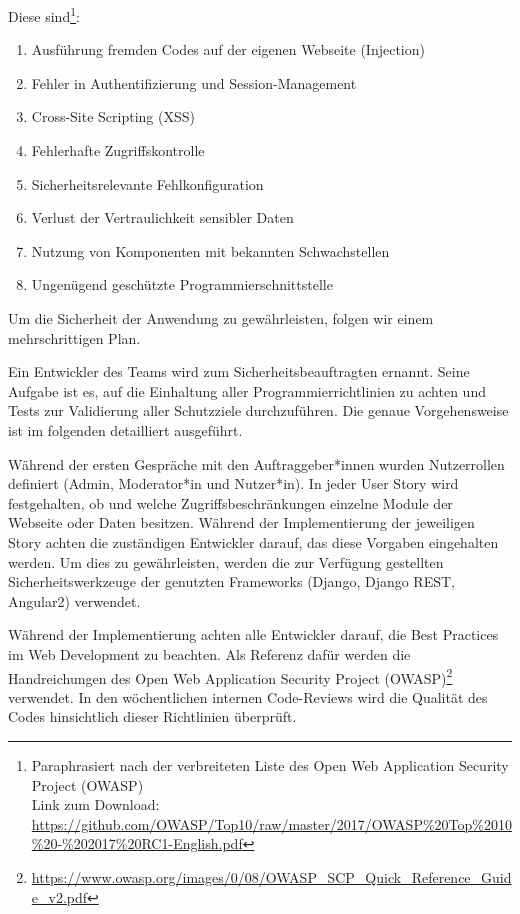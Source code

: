 \documentclass[accentcolor=tud0b,12pt,paper=a4]{tudreport}
\begin{document}
Diese sind\footnote{Paraphrasiert nach der verbreiteten Liste des Open Web Application Security Project (OWASP) \\
	Link zum Download:  \href{https://github.com/OWASP/Top10/raw/master/2017/OWASP\%20Top\%2010\%20-\%202017\%20RC1-English.pdf}{https://github.com/OWASP/Top10/raw/master/2017/OWASP\%20Top\%2010\%20-\%202017\%20RC1-English.pdf}}:
\begin{enumerate}
\item Ausführung fremden Codes auf der eigenen Webseite (Injection)
\item Fehler in Authentifizierung und Session-Management
\item Cross-Site Scripting (XSS)
\item Fehlerhafte Zugriffskontrolle
\item Sicherheitsrelevante Fehlkonfiguration
\item Verlust der Vertraulichkeit sensibler Daten
\item Nutzung von Komponenten mit bekannten Schwachstellen
\item Ungenügend geschützte Programmierschnittstelle
\end{enumerate}

Um die Sicherheit der Anwendung zu gewährleisten, folgen wir einem mehrschrittigen Plan. 

Ein Entwickler des Teams wird zum Sicherheitsbeauftragten ernannt. Seine Aufgabe ist es, auf die Einhaltung aller Programmierrichtlinien zu achten und Tests zur Validierung aller Schutzziele durchzuführen. Die genaue Vorgehensweise ist im folgenden detailliert ausgeführt.

Während der ersten Gespräche mit den Auftraggeber*innen wurden Nutzerrollen definiert (Admin, Moderator*in und Nutzer*in). In jeder User Story wird festgehalten, ob und welche Zugriffsbeschränkungen einzelne Module der Webseite oder Daten besitzen. Während der Implementierung der jeweiligen Story achten die zuständigen Entwickler darauf, das diese Vorgaben eingehalten werden. Um dies zu gewährleisten, werden die zur Verfügung gestellten Sicherheitswerkzeuge der genutzten Frameworks (Django, Django REST, Angular2) verwendet.

Während der Implementierung achten alle Entwickler darauf, die Best Practices im Web Development zu beachten. Als Referenz dafür werden die Handreichungen des Open Web Application Security Project (OWASP)\footnote{\href{https://www.owasp.org/images/0/08/OWASP_SCP_Quick_Reference_Guide_v2.pdf}{https://www.owasp.org/images/0/08/OWASP\_SCP\_Quick\_Reference\_Guide\_v2.pdf}} verwendet. In den wöchentlichen internen Code-Reviews wird die Qualität des Codes hinsichtlich dieser Richtlinien überprüft.
\end{document}
